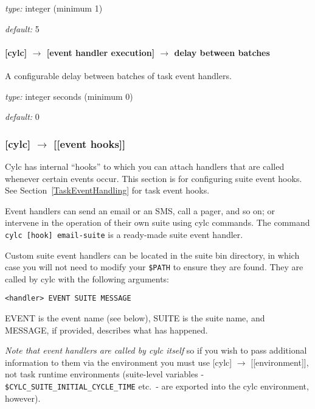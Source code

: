 \begin{myitemize}
    \item {\em type:} integer (minimum 1)
    \item {\em default:} 5
\end{myitemize}

\paragraph[delay between batches]{[cylc] $\rightarrow$ [event handler execution] $\rightarrow$ delay between batches}

A configurable delay between batches of task event handlers.

\begin{myitemize}
    \item {\em type:} integer seconds (minimum 0)
    \item {\em default:} 0
\end{myitemize}

\subsubsection[{[[}event hooks{]]}]{[cylc] $\rightarrow$ [[event hooks]]}
\label{SuiteEventHandling}

Cylc has internal ``hooks'' to which you can attach handlers that are 
called whenever certain events occur. This section is for configuring suite
event hooks. See Section~\ref{TaskEventHandling} for task event hooks.

Event handlers can send an email or an SMS, call a pager, and so on; or
intervene in the operation of their own suite using cylc commands. 
The command \lstinline=cylc [hook] email-suite= is a ready-made suite
event handler.

Custom suite event handlers can be located in the suite bin directory,  
in which case you will not need to modify your \lstinline=$PATH= to ensure
they are found.  They are called by cylc with the following arguments:
\begin{lstlisting}
<handler> EVENT SUITE MESSAGE
\end{lstlisting}
EVENT is the event name (see below), SUITE is the suite name, and 
MESSAGE, if provided, describes what has happened.

{\em Note that event handlers are called by cylc itself} so if you wish
to pass additional information to them via the environment you must use
[cylc] $\rightarrow$ [[environment]], not task runtime environments
(suite-level variables - \lstinline=$CYLC_SUITE_INITIAL_CYCLE_TIME=
etc.\ - are exported into the cylc environment, however).


